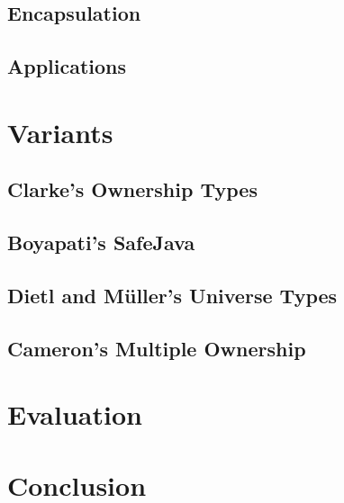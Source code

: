 \documentclass{acm_proc_article-sp}
\begin{document}
\lipsum[3]

\subsection{Encapsulation}
\label{subsec:encap}

\lipsum[4]

\subsection{Applications}
\label{subsec:apps}

\lipsum[5]




\section{Variants}
\label{sec:variants}

\subsection{Clarke's Ownership Types}
\label{subsec:clarke}

\subsection{Boyapati's SafeJava}
\label{subsec:boyapati}

\subsection{Dietl and M\"{u}ller's Universe Types}
\label{subsec:dietl}

\subsection{Cameron's Multiple Ownership}
\label{subsec:cameron}




\section{Evaluation}
\label{sec:eval}

\lipsum[6]




\section{Conclusion}
\label{sec:conclude}
\end{document}
